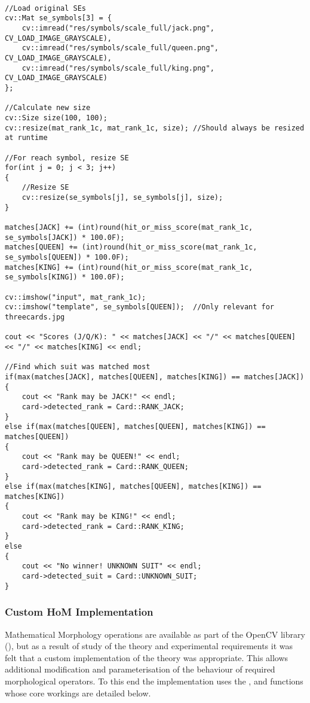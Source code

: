 			\begin{lstlisting}

//Load original SEs
cv::Mat se_symbols[3] = {
	cv::imread("res/symbols/scale_full/jack.png", CV_LOAD_IMAGE_GRAYSCALE),
	cv::imread("res/symbols/scale_full/queen.png", CV_LOAD_IMAGE_GRAYSCALE),
	cv::imread("res/symbols/scale_full/king.png", CV_LOAD_IMAGE_GRAYSCALE)
};

//Calculate new size
cv::Size size(100, 100);
cv::resize(mat_rank_1c, mat_rank_1c, size); //Should always be resized at runtime

//For reach symbol, resize SE
for(int j = 0; j < 3; j++)
{
	//Resize SE
	cv::resize(se_symbols[j], se_symbols[j], size); 
}

matches[JACK] += (int)round(hit_or_miss_score(mat_rank_1c, se_symbols[JACK]) * 100.0F);
matches[QUEEN] += (int)round(hit_or_miss_score(mat_rank_1c, se_symbols[QUEEN]) * 100.0F);
matches[KING] += (int)round(hit_or_miss_score(mat_rank_1c, se_symbols[KING]) * 100.0F);

cv::imshow("input", mat_rank_1c);
cv::imshow("template", se_symbols[QUEEN]);  //Only relevant for threecards.jpg

cout << "Scores (J/Q/K): " << matches[JACK] << "/" << matches[QUEEN] << "/" << matches[KING] << endl;

//Find which suit was matched most
if(max(matches[JACK], matches[QUEEN], matches[KING]) == matches[JACK])
{
	cout << "Rank may be JACK!" << endl;
	card->detected_rank = Card::RANK_JACK;
}
else if(max(matches[QUEEN], matches[QUEEN], matches[KING]) == matches[QUEEN])
{
	cout << "Rank may be QUEEN!" << endl;
	card->detected_rank = Card::RANK_QUEEN;
}
else if(max(matches[KING], matches[QUEEN], matches[KING]) == matches[KING])
{
	cout << "Rank may be KING!" << endl;
	card->detected_rank = Card::RANK_KING;
}
else
{
	cout << "No winner! UNKNOWN SUIT" << endl;
	card->detected_suit = Card::UNKNOWN_SUIT;
}
			\end{lstlisting}

		\subsubsection{Custom HoM Implementation}
			Mathematical Morphology operations are available as part of the OpenCV library\\(), but as a result of study of the theory and experimental requirements it was felt that a custom implementation of the theory was appropriate. This allows additional modification and parameterisation of the behaviour of required morphological operators. To this end the implementation uses the ,  and  functions whose core workings are detailed below.

